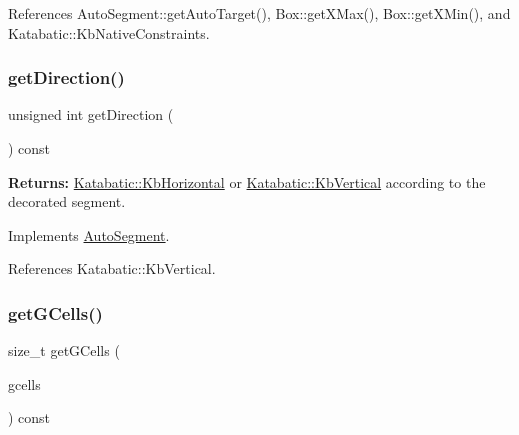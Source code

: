 References Auto\+Segment\+::get\+Auto\+Target(), Box\+::get\+X\+Max(), Box\+::get\+X\+Min(), and Katabatic\+::\+Kb\+Native\+Constraints.

\mbox{\label{classKatabatic_1_1AutoVertical_a0dd7cf705ace42c662c289955313b2e9}} 
\subsubsection{\texorpdfstring{get\+Direction()}{getDirection()}}
{\footnotesize\ttfamily unsigned int get\+Direction (\begin{DoxyParamCaption}{ }\end{DoxyParamCaption}) const\hspace{0.3cm}{\ttfamily [virtual]}}

{\bfseries Returns\+:} \hyperlink{namespaceKatabatic_a2af2ad6b6441614038caf59d04b3b217a1a9045673c5d3c30b067100f1440ae1b}{Katabatic\+::\+Kb\+Horizontal} or \hyperlink{namespaceKatabatic_a2af2ad6b6441614038caf59d04b3b217a284cad95203a27172838b09e396e3590}{Katabatic\+::\+Kb\+Vertical} according to the decorated segment. 

Implements \hyperlink{classKatabatic_1_1AutoSegment_ae35b78590ed6aa546b626ef95f28c533}{Auto\+Segment}.



References Katabatic\+::\+Kb\+Vertical.

\mbox{\label{classKatabatic_1_1AutoVertical_accdaef4410043f64da247a94a309733e}} 
\subsubsection{\texorpdfstring{get\+G\+Cells()}{getGCells()}}
{\footnotesize\ttfamily size\+\_\+t get\+G\+Cells (\begin{DoxyParamCaption}\item[{vector$<$ \hyperlink{classKatabatic_1_1GCell}{G\+Cell} $\ast$$>$ \&}]{gcells }\end{DoxyParamCaption}) const\hspace{0.3cm}{\ttfamily [virtual]}}


